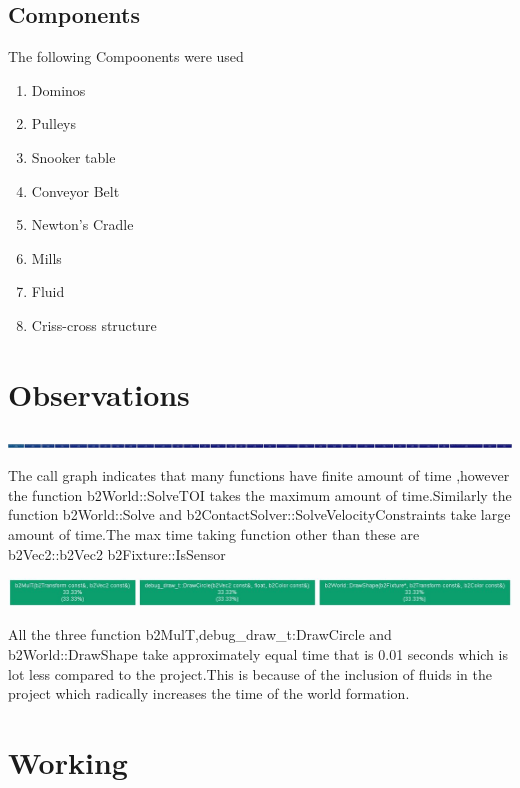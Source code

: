 \documentclass[]{report}
\begin{document}
\section{Components}
The following Compoonents were used
\begin{enumerate}
\item Dominos
\item  Pulleys
\item  Snooker table
\item Conveyor Belt
\item Newton's Cradle
\item Mills
\item Fluid
\item Criss-cross structure
\end{enumerate}

\newpage
\chapter{Observations}
\begin{center}
\includegraphics[width=15cm]{img/project}
\end{center}
The call graph indicates that many functions have finite amount of time ,however the function b2World::SolveTOI takes the maximum amount of time.Similarly the function b2World::Solve and b2ContactSolver::SolveVelocityConstraints take large amount of time.The max time taking function other than these are b2Vec2::b2Vec2 b2Fixture::IsSensor
\begin{center}
\includegraphics[width=15cm]{img/original}
\end{center}
All the three function b2MulT,debug\_draw\_t:DrawCircle and b2World::DrawShape take approximately equal time that is 0.01 seconds which is lot less compared to the project.This is because of the inclusion of fluids in the project which radically increases the time of the world formation. 
\newpage
\chapter{Working}
\end{document}
